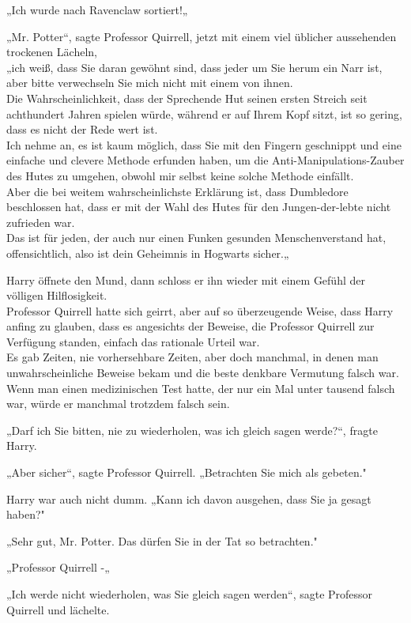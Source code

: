 {„Ich wurde nach Ravenclaw sortiert!„

„Mr. Potter“, sagte Professor Quirrell, jetzt mit einem viel üblicher aussehenden trockenen Lächeln,\\ „ich weiß, dass Sie daran gewöhnt sind, dass jeder um Sie herum ein Narr ist, aber bitte verwechseln Sie mich nicht mit einem von ihnen.\\ Die Wahrscheinlichkeit, dass der Sprechende Hut seinen ersten Streich seit achthundert Jahren spielen würde, während er auf Ihrem Kopf sitzt, ist so gering, dass es nicht der Rede wert ist.\\ Ich nehme an, es ist kaum möglich, dass Sie mit den Fingern geschnippt und eine einfache und clevere Methode erfunden haben, um die Anti-Manipulations-Zauber des Hutes zu umgehen, obwohl mir selbst keine solche Methode einfällt.\\ Aber die bei weitem wahrscheinlichste Erklärung ist, dass Dumbledore beschlossen hat, dass er mit der Wahl des Hutes für den Jungen-der-lebte nicht zufrieden war.\\ Das ist für jeden, der auch nur einen Funken gesunden Menschenverstand hat, offensichtlich, also ist dein Geheimnis in Hogwarts sicher.„

Harry öffnete den Mund, dann schloss er ihn wieder mit einem Gefühl der völligen Hilflosigkeit.\\ Professor Quirrell hatte sich geirrt, aber auf so überzeugende Weise, dass Harry anfing zu glauben, dass es angesichts der Beweise, die Professor Quirrell zur Verfügung standen, einfach das rationale Urteil war.\\ Es gab Zeiten, nie vorhersehbare Zeiten, aber doch manchmal, in denen man unwahrscheinliche Beweise bekam und die beste denkbare Vermutung falsch war.\\ Wenn man einen medizinischen Test hatte, der nur ein Mal unter tausend falsch war, würde er manchmal trotzdem falsch sein.

„Darf ich Sie bitten, nie zu wiederholen, was ich gleich sagen werde?“, fragte Harry.

„Aber sicher“, sagte Professor Quirrell. „Betrachten Sie mich als gebeten."

Harry war auch nicht dumm. „Kann ich davon ausgehen, dass Sie ja gesagt haben?"

„Sehr gut, Mr. Potter. Das dürfen Sie in der Tat so betrachten."

„Professor Quirrell -„

„Ich werde nicht wiederholen, was Sie gleich sagen werden“, sagte Professor Quirrell und lächelte.

}
